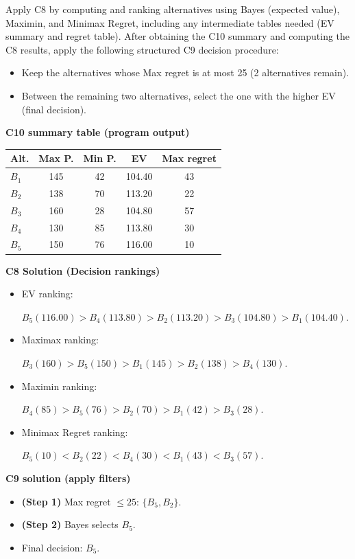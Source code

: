 \begin{ExamProblems}
		Apply C8 by computing and ranking alternatives using Bayes (expected value), Maximin, and Minimax Regret, including any intermediate tables needed (EV summary and regret table).
		After obtaining the C10 summary and computing the C8 results, apply the following structured C9 decision procedure:
		\begin{itemize}
			\item Keep the alternatives whose Max regret is at most 25 (2 alternatives remain).
			\item Between the remaining two alternatives, select the one with the higher EV (final decision).
		\end{itemize}
		
		\vspace{0.25cm}
		
		\textbf{C10 summary table (program output)}\par
		\begin{center}
			\begin{tabular}{l c c c c}
				\hline
				Alt. & Max P. & Min P. & EV & Max regret \\
				\hline
				$B_1$ & 145 & 42 & 104.40 & 43 \\
				$B_2$ & 138 & 70 & 113.20 & 22 \\
				$B_3$ & 160 & 28 & 104.80 & 57 \\
				$B_4$ & 130 & 85 & 113.80 & 30 \\
				$B_5$ & 150 & 76 & 116.00 & 10 \\
				\hline
			\end{tabular}
		\end{center}
		
		\textbf{C8 Solution (Decision rankings)}\par
		\begin{itemize}
			\item EV ranking: \par $B_5(116.00)>B_4(113.80)>B_2(113.20)>B_3(104.80)>B_1(104.40)$.
			\item Maximax ranking:\par $B_3(160)>B_5(150)>B_1(145)>B_2(138)>B_4(130)$.
			\item Maximin ranking: \par $B_4(85)>B_5(76)>B_2(70)>B_1(42)>B_3(28)$.
			\item Minimax Regret ranking:\par $B_5(10)<B_2(22)<B_4(30)<B_1(43)<B_3(57)$.
		\end{itemize}
		
		\textbf{C9 solution (apply filters)}\par
		\begin{itemize}
			\item \textbf{(Step 1)} Max regret $\leq 25$: $\{B_5,B_2\}$.
			\item \textbf{(Step 2)} Bayes selects $B_5$.
			\item Final decision: $B_5$.
		\end{itemize}
		

\end{ExamProblems}
